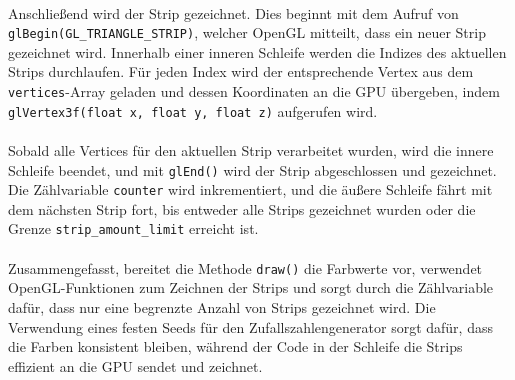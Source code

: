 \\
Anschließend wird der Strip gezeichnet. Dies beginnt mit dem Aufruf von \break
\lstinline{glBegin(GL_TRIANGLE_STRIP)}, welcher OpenGL mitteilt, dass ein neuer Strip
gezeichnet wird. Innerhalb einer inneren Schleife werden die Indizes des
aktuellen Strips durchlaufen. Für jeden Index wird der entsprechende Vertex aus
dem \lstinline{vertices}-Array geladen und dessen Koordinaten an die GPU übergeben, indem
\lstinline{glVertex3f(float x, float y, float z)} aufgerufen wird.
\\
\\
Sobald alle Vertices für den aktuellen Strip verarbeitet wurden, wird die innere
Schleife beendet, und mit \lstinline{glEnd()} wird der Strip abgeschlossen und gezeichnet.
Die Zählvariable \lstinline{counter} wird inkrementiert, und die äußere Schleife fährt mit
dem nächsten Strip fort, bis entweder alle Strips gezeichnet wurden oder die
Grenze \lstinline{strip_amount_limit} erreicht ist.
\\
\\
Zusammengefasst, bereitet die Methode \lstinline{draw()} die Farbwerte vor, verwendet
OpenGL-Funktionen zum Zeichnen der Strips und sorgt durch die Zählvariable
dafür, dass nur eine begrenzte Anzahl von Strips gezeichnet wird. Die Verwendung
eines festen Seeds für den Zufallszahlengenerator sorgt dafür, dass die Farben
konsistent bleiben, während der Code in der Schleife die Strips effizient an die
GPU sendet und zeichnet.